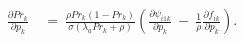\begin{equation}
\begin{split}
    \frac{\partial Pr_{k}}{\partial p_{k}} \
    & = \ \frac{\rho Pr_{k} (1 - Pr_{k})}{\sigma (\lambda_{a} Pr_{k} + \rho)} \left( \frac{\partial \psi_{i1k}}{\partial p_{k}} \ - \ \frac{1}{\rho} \frac{\partial f_{ik}}{\partial p_{k}} \right).
\end{split}
\label{Equation:Equilibrium-Paths_Applying-IFT}
\end{equation}